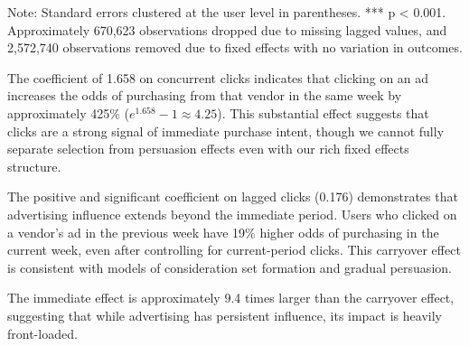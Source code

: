 Note: Standard errors clustered at the user level in parentheses. *** p < 0.001. Approximately 670,623 observations dropped due to missing lagged values, and 2,572,740 observations removed due to fixed effects with no variation in outcomes.

The coefficient of 1.658 on concurrent clicks indicates that clicking on an ad increases the odds of purchasing from that vendor in the same week by approximately 425\% ($e^{1.658} - 1 \approx 4.25$). This substantial effect suggests that clicks are a strong signal of immediate purchase intent, though we cannot fully separate selection from persuasion effects even with our rich fixed effects structure.

The positive and significant coefficient on lagged clicks (0.176) demonstrates that advertising influence extends beyond the immediate period. Users who clicked on a vendor's ad in the previous week have 19\% higher odds of purchasing in the current week, even after controlling for current-period clicks. This carryover effect is consistent with models of consideration set formation and gradual persuasion.

The immediate effect is approximately 9.4 times larger than the carryover effect, suggesting that while advertising has persistent influence, its impact is heavily front-loaded.
